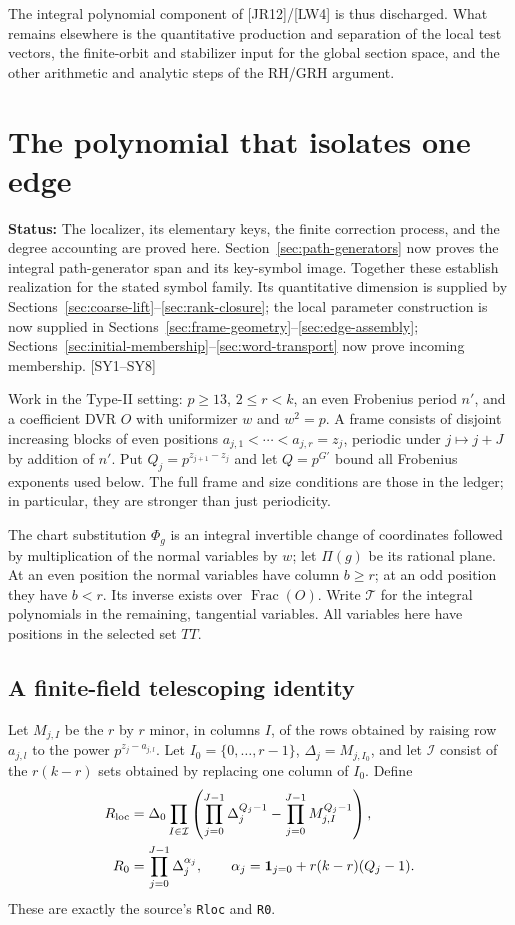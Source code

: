 \documentclass[11pt,a4paper]{article}
\numberwithin{equation}{section}
\theoremstyle{remark}\newtheorem{remark}[theorem]{Remark}
\newcommand{\status}[1]{\textbf{Status:} #1}
\begin{document}
The integral polynomial component of [JR12]/[LW4] is thus discharged. What remains elsewhere is the quantitative production and separation of the local test vectors, the finite-orbit and stabilizer input for the global section space, and the other arithmetic and analytic steps of the RH/GRH argument.

\section{The polynomial that isolates one edge}\label{sec:symbols}

\status{The localizer, its elementary keys, the finite correction process, and the degree accounting are proved here. Section~\ref{sec:path-generators} now proves the integral path-generator span and its key-symbol image. Together these establish realization for the stated symbol family. Its quantitative dimension is supplied by Sections~\ref{sec:coarse-lift}--\ref{sec:rank-closure}; the local parameter construction is now supplied in Sections~\ref{sec:frame-geometry}--\ref{sec:edge-assembly}; Sections~\ref{sec:initial-membership}--\ref{sec:word-transport} now prove incoming membership.} \textsf{[SY1--SY8]}

Work in the Type-II setting: $p\ge13$, $2\le r<k$, an even Frobenius period $n'$, and a coefficient DVR $O$ with uniformizer $w$ and $w^2=p$. A frame consists of disjoint increasing blocks of even positions $a_{j,1}<\cdots<a_{j,r}=z_j$, periodic under $j\mapsto j+J$ by addition of $n'$. Put $Q_j=p^{z_{j+1}-z_j}$ and let $Q=p^{G'}$ bound all Frobenius exponents used below. The full frame and size conditions are those in the ledger; in particular, they are stronger than just periodicity.

The chart substitution $\Phi_g$ is an integral invertible change of coordinates followed by multiplication of the normal variables by $w$; let $\Pi(g)$ be its rational plane. At an even position the normal variables have column $b\ge r$; at an odd position they have $b<r$. Its inverse exists over $\operatorname{Frac}(O)$. Write $\mathcal T$ for the integral polynomials in the remaining, tangential variables. All variables here have positions in the selected set $TT$.

\subsection{A finite-field telescoping identity}

Let $M_{j,I}$ be the $r$ by $r$ minor, in columns $I$, of the rows obtained by raising row $a_{j,l}$ to the power $p^{z_j-a_{j,l}}$. Let $I_0=\{0,\ldots,r-1\}$, $\Delta_j=M_{j,I_0}$, and let $\mathcal I$ consist of the $r(k-r)$ sets obtained by replacing one column of $I_0$. Define
\begin{align}
R_{\rm loc}&=\Delta_0\prod_{I\in\mathcal I}
 \left(\prod_{j=0}^{J-1}\Delta_j^{Q_j-1}
             -\prod_{j=0}^{J-1}M_{j,I}^{Q_j-1}\right),\label{eq:sy-localizer}\\
R_0&=\prod_{j=0}^{J-1}\Delta_j^{\alpha_j},\qquad
\alpha_j=\mathbf1_{j=0}+r(k-r)(Q_j-1).
\end{align}
These are exactly the source's \texttt{Rloc} and \texttt{R0}.\cite{symbol-source,symbol-elementary}
\end{document}
